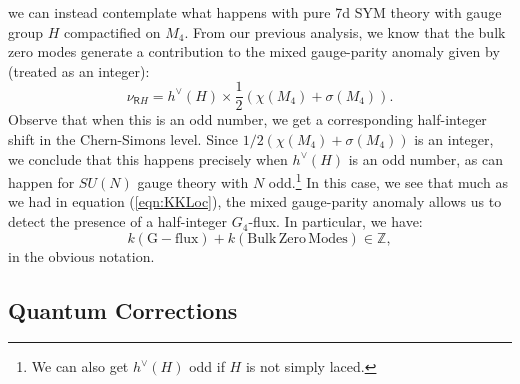 \documentclass[12pt]{article}%
\numberwithin{equation}{section}
\renewcommand{\(}{\left(}
\renewcommand{\)}{\right)}
\renewcommand{\[}{\left[}
\renewcommand{\]}{\right]}
\begin{document}
we can instead contemplate what happens with pure 7d SYM theory with gauge group $H$
compactified on $M_4$. From our previous analysis, we know that the bulk zero modes
generate a contribution to the mixed gauge-parity anomaly given by (treated as an integer):
\begin{equation}
\nu_{\mathsf{R} H} = h^{\lor}(H) \times \frac{1}{2}( \chi(M_4) + \sigma(M_4)).
\end{equation}
Observe that when this is an odd number, we get a corresponding half-integer shift in the Chern-Simons level. Since $1/2( \chi(M_4) + \sigma(M_4))$ is an integer, we conclude that this happens precisely when $h^{\lor}(H)$
is an odd number, as can happen for $SU(N)$ gauge theory with $N$ odd.\footnote{We can also
get $h^{\lor}(H)$ odd if $H$ is not simply laced.} In this case, we see that much as we had in equation (\ref{eqn:KKLoc}),
the mixed gauge-parity anomaly allows us to detect the presence of a half-integer $G_4$-flux.
In particular, we have:
\begin{equation}
k(\mathrm{G-flux}) + k(\mathrm{Bulk\,Zero\,Modes}) \in \mathbb{Z},
\end{equation}
in the obvious notation.

\subsection{Quantum Corrections \label{ssec:QUANTCORR}}
\end{document}
